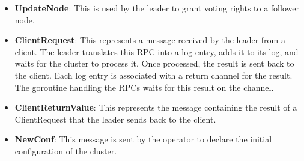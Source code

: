 \begin{itemize}
  \item \textbf{UpdateNode}: This is used by the leader to grant voting rights to a follower node.

  \item \textbf{ClientRequest}: This represents a message received by the leader from a client. The 
    leader translates this RPC into a log entry, adds it to its log, and waits for the 
    cluster to process it. Once processed, the result is sent back to the client. Each 
    log entry is associated with a return channel for the result. The goroutine handling 
    the RPCs waits for this result on the channel.

  \item \textbf{ClientReturnValue}: This represents the message containing the result 
    of a ClientRequest that the leader sends back to the client.

  \item \textbf{NewConf}: This message is sent by the operator to declare the initial 
    configuration of the cluster. 
\end{itemize}
